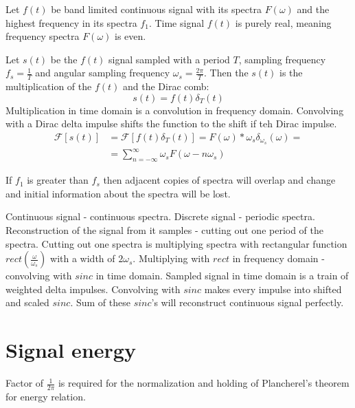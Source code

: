 \documentclass{article}
\begin{document}
Let $f(t)$ be band limited continuous signal with its spectra $F(\omega)$ and the highest frequency in its spectra $f_1$. 
Time signal $f(t)$ is purely real, meaning frequency spectra $F(\omega)$ is even.



Let $s(t)$ be the $f(t)$ signal sampled with a period $T$, sampling frequency $f_s = \frac{1}{T}$
 and angular sampling frequency $\omega_s = \frac{2 \pi }{T}$.
 Then the $s(t)$ is the multiplication of the $f(t)$ and the Dirac comb:
 \begin{equation*}
    s(t) = f(t) \delta_{T}(t)
 \end{equation*}
 Multiplication in time domain is a convolution in frequency domain.
 Convolving with a Dirac delta impulse shifts the function to the shift if teh Dirac impulse.
 \begin{align*}
    \mathcal{F}[s(t)] &= \mathcal{F}[f(t) \delta_{T}(t)] = F(\omega) * \omega_s \delta_{\omega_s}(\omega) = \\
    &=\sum \limits^{\infty}_{n = -\infty} \omega_s F(\omega - n \omega_s)
 \end{align*}

 If $f_1$ is greater than $f_s$ then adjacent copies of spectra will overlap and change and initial information about 
 the spectra will be lost.

 Continuous signal - continuous spectra.
 Discrete signal - periodic spectra.
 Reconstruction of the signal from it samples - cutting out one period of the spectra.
 Cutting out one spectra is multiplying spectra with rectangular function $rect(\frac{\omega}{\omega_s})$ with a width of $2\omega_s$.
 Multiplying with $rect$ in frequency domain - convolving with $sinc$ in time domain.
 Sampled signal in time domain is a train of weighted delta impulses. Convolving with $sinc$ makes every impulse into shifted and scaled $sinc$.
 Sum of these $sinc$'s will reconstruct continuous signal perfectly.


\section{Signal energy}
Factor of $\frac{1}{2 \pi}$ is required for the normalization and holding of Plancherel's theorem for energy relation.
\end{document}
